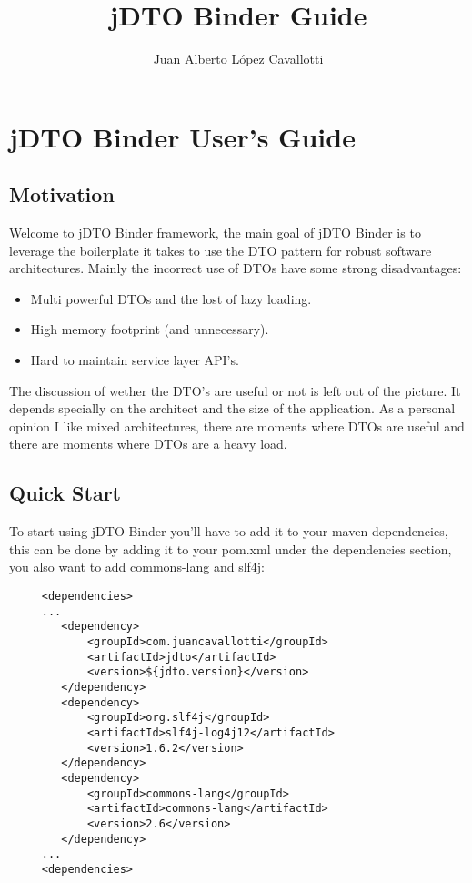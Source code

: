 \documentclass[12pt]{article}
\title{jDTO Binder Guide}
\author{Juan Alberto López Cavallotti}
\newcommand{\JDTO}{jDTO Binder }
\begin{document}
\maketitle
\tableofcontents

\section{\JDTO  User's Guide}
\subsection{Motivation}

Welcome to \JDTO framework, the main goal of \JDTO is to leverage the boilerplate it takes to use
the DTO pattern for robust software architectures. Mainly the incorrect use of DTOs have some strong
disadvantages: 

\begin{itemize}
\item Multi powerful DTOs and the lost of lazy loading.
\item High memory footprint (and unnecessary).
\item Hard to maintain service layer API's.
\end{itemize}

The discussion of wether the DTO's are useful or not is left out of the picture. It depends specially on 
the architect and the size of the application. As a personal opinion I like mixed architectures, there are
moments where DTOs are useful and there are moments where DTOs are a heavy load.

\subsection{Quick Start}

To start using \JDTO you'll have to add it to your maven dependencies, this can be done
by adding it to your pom.xml under the dependencies section, you also want to add commons-lang and slf4j:

\begin{verbatim}
     <dependencies>
     ...
        <dependency>
            <groupId>com.juancavallotti</groupId>
            <artifactId>jdto</artifactId>
            <version>${jdto.version}</version>
        </dependency>
        <dependency>
            <groupId>org.slf4j</groupId>
            <artifactId>slf4j-log4j12</artifactId>
            <version>1.6.2</version>
        </dependency>
        <dependency>
            <groupId>commons-lang</groupId>
            <artifactId>commons-lang</artifactId>
            <version>2.6</version>
        </dependency>
     ...
     <dependencies>
\end{verbatim}
\end{document}
